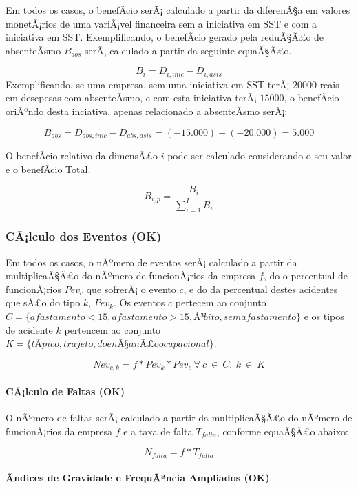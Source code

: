 \documentclass[]{article}
\let\oldparagraph\paragraph
\renewcommand{\paragraph}[1]{\oldparagraph{#1}\mbox{}}
\begin{document}
Em todos os casos, o benefÃ­cio serÃ¡ calculado a partir da diferenÃ§a
em valores monetÃ¡rios de uma variÃ¡vel financeira sem a iniciativa em
SST e com a iniciativa em SST. Exemplificando, o benefÃ­cio gerado pela
reduÃ§Ã£o de absenteÃ­smo \(B_{abs}\) serÃ¡ calculado a partir da
seguinte equaÃ§Ã£o.

\[B_i = {D}_{i, inic} - {D}_{i, asis}\] Exemplificando, se uma empresa,
sem uma iniciativa em SST terÃ¡ \(20000\) reais em desepesas com
absenteÃ­smo, e com esta iniciativa terÃ¡ \(15000\), o benefÃ­cio
oriÃºndo desta inciativa, apenas relacionado a absenteÃ­smo serÃ¡:

\[B_{abs} = {D}_{abs, inic} - {D}_{abs, asis} = (-15.000)-(-20.000) = 5.000\]

O benefÃ­cio relativo da dimensÃ£o \(i\) pode ser calculado considerando
o seu valor e o benefÃ­cio Total.

\[B_{i,p} = \frac{B_{i}}{\sum_{i=1}^{I} B_{i}}\]

\subsubsection{CÃ¡lculo dos Eventos (OK)}\label{calculo-dos-eventos-ok}

Em todos os casos, o nÃºmero de eventos serÃ¡ calculado a partir da
multiplicaÃ§Ã£o do nÃºmero de funcionÃ¡rios da empresa \(f\), do o
percentual de funcionÃ¡rios \(Pev_c\) que sofrerÃ¡ o evento \(c\), e do
da percentual destes acidentes que sÃ£o do tipo \(k\), \(Pev_{k}\). Os
eventos \(c\) pertecem ao conjunto
\(C =\{afastamento<15, afastamento>15, Ã³bito, sem afastamento\}\) e os
tipos de acidente \(k\) pertencem ao conjunto
\(K= \{tÃ­pico, trajeto, doenÃ§a nÃ£o ocupacional\}\).

\[Nev_{c,k}= f * Pev_{k} * Pev_{c} \ \forall \ c \  \in \ C,  \ k \  \in \ K\]

\paragraph{CÃ¡lculo de Faltas (OK)}\label{calculo-de-faltas-ok}

O nÃºmero de faltas serÃ¡ calculado a partir da multiplicaÃ§Ã£o do
nÃºmero de funcionÃ¡rios da empresa \(f\) e a taxa de falta
\(T_{falta}\), conforme equaÃ§Ã£o abaixo:

\[N_{falta} = f * T_{falta}\]

\paragraph{Ãndices de Gravidade e FrequÃªncia Ampliados
(OK)}\label{andices-de-gravidade-e-frequancia-ampliados-ok}
\end{document}
